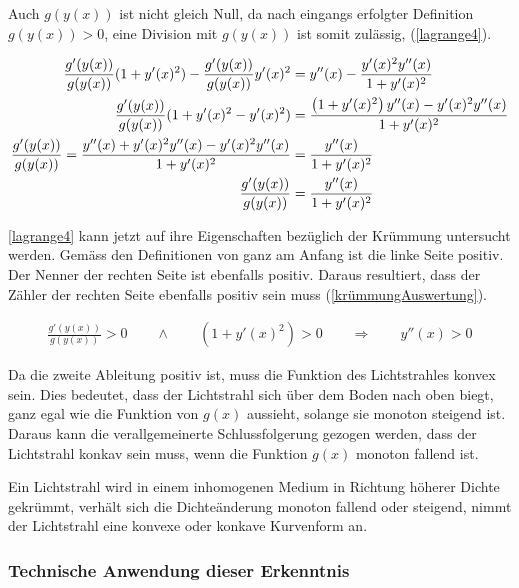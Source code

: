 Auch $g(y(x))$ ist nicht gleich Null, da nach eingangs erfolgter Definition $g(y(x)) > 0$, eine Division mit $g(y(x))$ ist somit zulässig, (\eqref{lagrange4}).

\begin{align}
	\frac{g'(y(x))}{g(y(x))} (1 + y'(x)^2) - \frac{g'(y(x))}{g(y(x))} y'(x)^2 &=  y''(x) - \frac{y'(x)^2 y''(x)}{1 + y'(x)^2} \notag \\
	\frac{g'(y(x))}{g(y(x))} (1 + y'(x)^2 - y'(x)^2) &= \frac{\left(1 + y'(x)^2 \right)y''(x) - y'(x)^2 y''(x)}{1 + y'(x)^2} \notag \\
	\frac{g'(y(x))}{g(y(x))} = \frac{y''(x) + y'(x)^2 y''(x) - y'(x)^2 y''(x)}{1 + y'(x)^2} &= \frac{y''(x)}{1 + y'(x)^2}\notag \\
	\frac{g'(y(x))}{g(y(x))} &= \frac{y''(x)}{1 + y'(x)^2}
	\label{lagrange4}
\end{align}


\eqref{lagrange4} kann jetzt auf ihre Eigenschaften bezüglich der Krümmung untersucht werden. Gemäss den Definitionen von ganz am Anfang ist die linke Seite positiv. 
Der Nenner der rechten Seite ist ebenfalls positiv. Daraus resultiert, dass der Zähler der rechten Seite ebenfalls positiv sein muss (\eqref{krümmungAuswertung}).

\begin{align}
	\frac{g'(y(x))}{g(y(x))} > 0 \qquad \wedge \qquad (1 + y'(x)^2) > 0 \qquad \Rightarrow \qquad y''(x) > 0
	\label{krümmungAuswertung}
\end{align}

Da die zweite Ableitung positiv ist, muss die Funktion des Lichtstrahles konvex sein.
Dies bedeutet, dass der Lichtstrahl sich über dem Boden nach oben biegt, ganz egal wie die Funktion von $g(x)$ aussieht, solange sie monoton steigend ist.
Daraus kann die verallgemeinerte Schlussfolgerung gezogen werden, dass der Lichtstrahl konkav sein muss, wenn die Funktion $g(x)$ monoton fallend ist.
\begin{satz}
Ein Lichtstrahl wird in einem inhomogenen Medium in Richtung höherer Dichte gekrümmt, verhält sich die Dichteänderung monoton fallend oder steigend, nimmt der Lichtstrahl eine konvexe oder konkave Kurvenform an.
\end{satz}

\subsubsection{Technische Anwendung dieser Erkenntnis}


